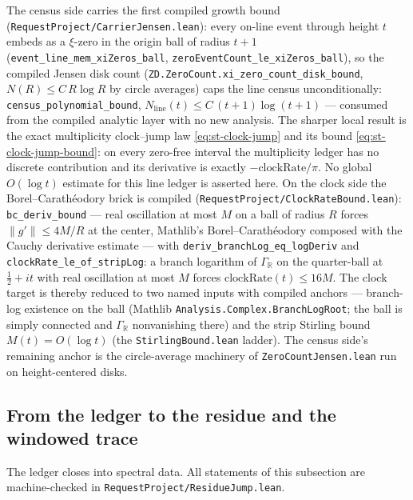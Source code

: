 \documentclass[11pt]{article}
\theoremstyle{definition}
\begin{document}
The census side carries the first compiled growth bound
(\texttt{RequestProject/CarrierJensen.lean}): every on-line event through height $t$ embeds as a
$\xi$-zero in the origin ball of radius $t+1$
(\texttt{event\_line\_mem\_xiZeros\_ball}, \texttt{zeroEventCount\_le\_xiZeros\_ball}), so the
compiled Jensen disk count (\texttt{ZD.ZeroCount.xi\_zero\_count\_disk\_bound}, $N(R)\le C\,R\log R$
by circle averages) caps the line census unconditionally:
\texttt{census\_polynomial\_bound}, $N_{\mathrm{line}}(t)\le C\,(t{+}1)\log(t{+}1)$ --- consumed
from the compiled analytic layer with no new analysis.  The sharper local result is the exact
multiplicity clock--jump law \eqref{eq:st-clock-jump} and its bound
\eqref{eq:st-clock-jump-bound}: on every zero-free interval the multiplicity ledger has no
discrete contribution and its derivative is exactly $-\mathrm{clockRate}/\pi$.  No global
$O(\!\log t)$ estimate for this line ledger is asserted here.  On the clock side
the Borel--Carath\'eodory brick is compiled (\texttt{RequestProject/ClockRateBound.lean}):
\texttt{bc\_deriv\_bound} --- real oscillation at most $M$ on a ball of radius $R$ forces
$\lVert g'\rVert\le 4M/R$ at the center, Mathlib's Borel--Carath\'eodory composed with the Cauchy
derivative estimate --- with \texttt{deriv\_branchLog\_eq\_logDeriv} and
\texttt{clockRate\_le\_of\_stripLog}: a branch logarithm of $\Gamma_{\mathbb R}$ on the
quarter-ball at $\tfrac12+it$ with real oscillation at most $M$ forces
$\mathrm{clockRate}(t)\le 16M$.  The clock target is thereby reduced to two named inputs with
compiled anchors --- branch-log existence on the ball (Mathlib
\texttt{Analysis.Complex.BranchLogRoot}; the ball is simply connected and $\Gamma_{\mathbb R}$
nonvanishing there) and the strip Stirling bound $M(t)=O(\log t)$ (the
\texttt{StirlingBound.lean} ladder).  The census side's remaining anchor is the circle-average
machinery of \texttt{ZeroCountJensen.lean} run on height-centered disks.

\subsection{From the ledger to the residue and the windowed trace}\label{sec:residue-jump}

The ledger closes into spectral data.  All statements of this subsection are
machine-checked in \texttt{RequestProject/ResidueJump.lean}.
\end{document}
